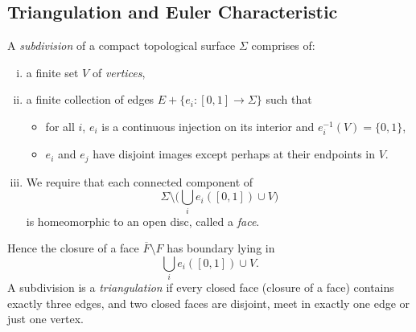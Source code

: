 \documentclass[12pt]{article}
\begin{document}
\begin{figure}[h]
	\centering
	\caption{Squishing down $\mathbb{RP}^2$}
	\label{fig:squish_rp2}
	\begin{subfigure}{.5\textwidth}
		\centering
	\end{subfigure}%
	\begin{subfigure}{.5\textwidth}
		\centering
	\end{subfigure}
\end{figure}

\subsection{Triangulation and Euler Characteristic}
\label{sub:triangulation_and_euler_characteristic}

\begin{definition}
	A \emph{subdivision} of a compact topological surface $\Sigma$ comprises of:
	\begin{enumerate}[(i)]
		\item a finite set $V$ of \emph{vertices},
		\item a finite collection of edges $E + \{e_i : [0,1] \to \Sigma\}$ such that
			\begin{itemize}
				\item for all $i$, $e_i$ is a continuous injection on its interior and $e_i^{-1}(V) = \{0, 1\}$,
				\item $e_i$ and $e_j$ have disjoint images except perhaps at their endpoints in $V$.
			\end{itemize}
		\item We require that each connected component of
			\[
				\Sigma \setminus \Biggl( \bigcup_{i} e_i ([0,1]) \cup V \Biggr)
			\]
			is homeomorphic to an open disc, called a \emph{face}.
	\end{enumerate}
	Hence the closure of a face $\overline{F} \setminus F$ has boundary lying in
	\[
		\bigcup_{i} e_i ([0,1]) \cup V
	.\]
	A subdivision is a \emph{triangulation} if every closed face (closure of a face) contains exactly three edges, and two closed faces are disjoint, meet in exactly one edge or just one vertex.
\end{definition}
\end{document}
